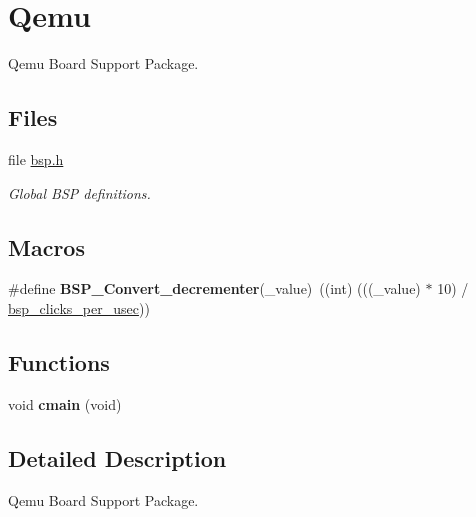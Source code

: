 \hypertarget{group__RTEMSBSPsPowerPCQemu}{}\section{Qemu}
\label{group__RTEMSBSPsPowerPCQemu}


Qemu Board Support Package.  


\subsection*{Files}
\begin{DoxyCompactItemize}
\item 
file \mbox{\hyperlink{bsps_2powerpc_2qemuppc_2include_2bsp_8h}{bsp.\+h}}
\begin{DoxyCompactList}\small\item\em Global B\+SP definitions. \end{DoxyCompactList}\end{DoxyCompactItemize}
\subsection*{Macros}
\begin{DoxyCompactItemize}
\item 
\mbox{\label{group__RTEMSBSPsPowerPCQemu_ga5b3b7a8f2f89a6110c93e0229f67c104}} 
\#define {\bfseries B\+S\+P\+\_\+\+Convert\+\_\+decrementer}(\+\_\+value)~((int) (((\+\_\+value) $\ast$ 10) / \mbox{\hyperlink{group__RTEMSBSPsPowerPCGen83XX_gabfae404b02d5b3193b9420930d97d84a}{bsp\+\_\+clicks\+\_\+per\+\_\+usec}}))
\end{DoxyCompactItemize}
\subsection*{Functions}
\begin{DoxyCompactItemize}
\item 
\mbox{\label{group__RTEMSBSPsPowerPCQemu_ga44b2b259538bbf7a69cec712cffeb849}} 
void {\bfseries cmain} (void)
\end{DoxyCompactItemize}


\subsection{Detailed Description}
Qemu Board Support Package. 

